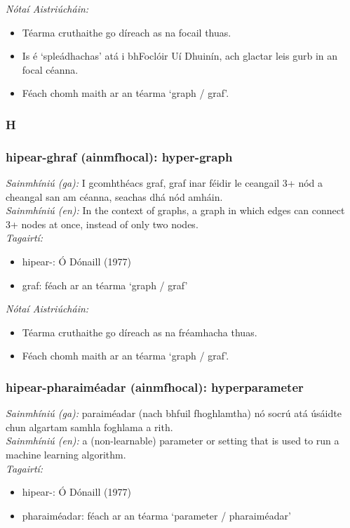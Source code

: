  \noindent \textit{Nótaí Aistriúcháin:}
\begin{itemize}
	\item Téarma cruthaithe go díreach as na focail thuas.
	\item Is é `spleádhachas' atá i bhFoclóir Uí Dhuinín, ach glactar leis gurb in an focal céanna.
	\item Féach chomh maith ar an téarma `graph / graf'.
\end{itemize}


 \subsubsection*{H}

\subsubsection*{hipear-ghraf (ainmfhocal): hyper-graph}
 \noindent \textit{Sainmhíniú (ga):} I gcomhthéacs graf, graf inar féidir le ceangail 3+ nód a cheangal san am céanna, seachas dhá nód amháin.
\\
 \noindent \textit{Sainmhíniú (en):} In the context of graphs, a graph in which edges can connect 3+ nodes at once, instead of only two nodes.
\\
 \noindent \textit{Tagairtí:}
\begin{itemize}
	\item hipear-: Ó Dónaill (1977) \cite{odonaill}
	\item graf: féach ar an téarma `graph / graf'
\end{itemize}

 \noindent \textit{Nótaí Aistriúcháin:}
\begin{itemize}
	\item Téarma cruthaithe go díreach as na fréamhacha thuas.
	\item Féach chomh maith ar an téarma `graph / graf'.
\end{itemize}


\subsubsection*{hipear-pharaiméadar (ainmfhocal): hyperparameter}
 \noindent \textit{Sainmhíniú (ga):} paraiméadar (nach bhfuil fhoghlamtha) nó socrú atá úsáidte chun algartam samhla foghlama a rith.
\\
 \noindent \textit{Sainmhíniú (en):} a (non-learnable) parameter or setting that is used to run a machine learning algorithm.
\\
 \noindent \textit{Tagairtí:}
\begin{itemize}
	\item hipear-: Ó Dónaill (1977) \cite{odonaill}
	\item pharaiméadar: féach ar an téarma `parameter / pharaiméadar'
\end{itemize}


